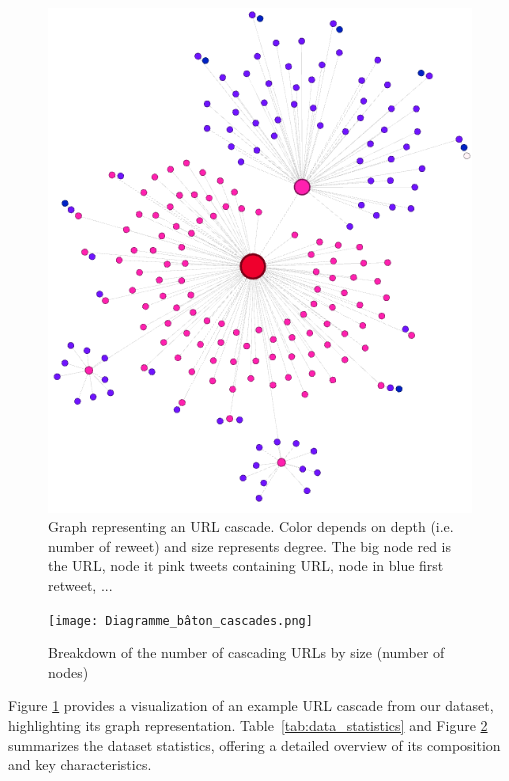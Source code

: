 \documentclass[sigconf,nonacm]{acmart}
\begin{document}
\begin{figure}
    \centering
    \includegraphics[scale=0.3]{graph_528_label_0_better_representation.png}
    \caption{Graph representing an URL cascade. Color depends on depth (i.e. number of reweet) and size represents degree. The big node red is the URL, node it pink tweets containing URL, node in blue first retweet, ...}
    \label{fig:url_cascade}
\end{figure}

\begin{figure}
    \centering
    \texttt{[image: Diagramme\_bâton\_cascades.png]}
    \caption{Breakdown of the number of cascading URLs by size (number of nodes)}
    \label{fig:graph_repartition}
\end{figure}



Figure \ref{fig:url_cascade} provides a visualization of an example URL cascade from our dataset, highlighting its graph representation. Table~\ref{tab:data_statistics} and Figure \ref{fig:graph_repartition} summarizes the dataset statistics, offering a detailed overview of its composition and key characteristics.
\end{document}
